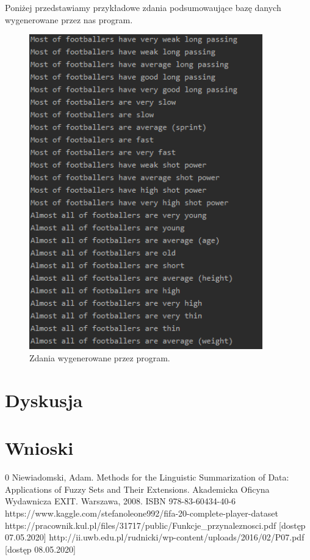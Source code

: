 \documentclass{classrep}
\begin{document}
	Poniżej przedstawiamy przykładowe zdania podsumowaujące bazę danych wygenerowane przez nas program.
	\begin{figure}[h!]
		\centering
		\includegraphics[width=0.9\textwidth]{zdania1.png}
		\caption{Zdania wygenerowane przez program.}
		\label{zdania}
	\end{figure}
	
	\section{Dyskusja} %
	
	\section{Wnioski}
		
	
	\begin{thebibliography} {0}
		 Niewiadomski, Adam. Methods for the Linguistic Summarization of Data: Applications of Fuzzy Sets and Their Extensions. Akademicka Oficyna Wydawnicza EXIT. Warszawa, 2008. ISBN 978-83-60434-40-6
		 https://www.kaggle.com/stefanoleone992/fifa-20-complete-player-dataset 
		 https://pracownik.kul.pl/files/31717/public/Funkcje\_przynaleznosci.pdf [dostęp 07.05.2020]
		 http://ii.uwb.edu.pl/rudnicki/wp-content/uploads/2016/02/P07.pdf [dostęp 08.05.2020]
	\end{thebibliography}
\end{document}
